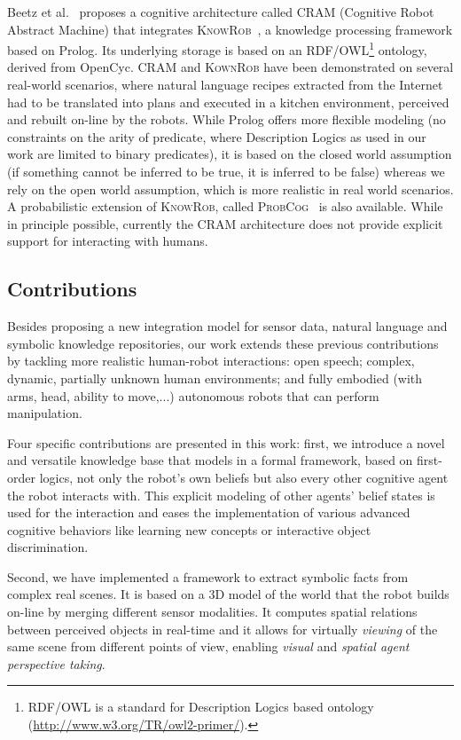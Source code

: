 \documentclass[twocolumn]{svjour3}
\begin{document}
Beetz et al.~\cite{Beetz2010} proposes a cognitive architecture called
\textsc{CRAM} (Cognitive Robot Abstract Machine) that integrates
\textsc{KnowRob}~\cite{Tenorth2009a}, a knowledge processing framework based on
Prolog. Its underlying storage is based on an RDF/OWL\footnote{RDF/OWL is a
standard for Description Logics based ontology
(\url{http://www.w3.org/TR/owl2-primer/}).} ontology, derived from
OpenCyc. \textsc{CRAM} and \textsc{KownRob} have been demonstrated on
several real-world scenarios, where natural language recipes extracted from the
Internet had to be translated into plans and executed in a kitchen environment,
perceived and rebuilt on-line by the robots. While Prolog offers more flexible
modeling (no constraints on the arity of predicate, where Description Logics as
used in our work are limited to binary predicates), it is based on the closed
world assumption (if something cannot be inferred to be true, it is inferred to
be false) whereas we rely on the open world assumption, which is more realistic
in real world scenarios. A probabilistic extension of \textsc{KnowRob}, called
\textsc{ProbCog}~\cite{Jain2009} is also available. While in principle
possible, currently the CRAM architecture does not provide explicit support for
interacting with humans.


\subsection{Contributions}

Besides proposing a new integration model for sensor data, natural language and
symbolic knowledge repositories, our work extends these previous contributions
by tackling more realistic human-robot interactions: open speech; complex,
dynamic, partially unknown human environments; and fully embodied (with arms,
head, ability to move,...) autonomous robots that can perform manipulation.

Four specific contributions are presented in this work: first, we introduce a
novel and versatile knowledge base that models in a formal framework, based on
first-order logics, not only the robot's own beliefs but also every other
cognitive agent the robot interacts with.  This explicit modeling of other
agents' belief states is used for the interaction and eases the implementation
of various advanced cognitive behaviors like learning new concepts or
interactive object discrimination.

Second, we have implemented a framework to extract symbolic facts from complex
real scenes. It is based on a 3D model of the world that the robot builds
on-line by merging different sensor modalities. It computes spatial relations
between perceived objects in real-time and it allows for virtually \emph{viewing}
of the same scene from different points of view, enabling \emph{visual} and
\emph{spatial agent perspective taking}.
\end{document}
